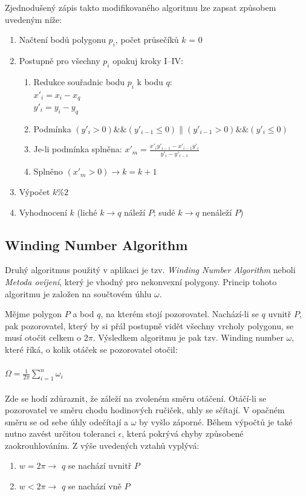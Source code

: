 \documentclass[a4paper, 12pt]{article}
\begin{document}
Zjednodušený zápis takto modifikovaného algoritmu lze zapsat způsobem uvedeným níže:
\begin{enumerate}
\item Načtení bodů polygonu $p_i$, počet průsečíků $k$ = 0
\item Postupně pro všechny $p_i$ opakuj kroky I–IV:
\begin{enumerate}[label=\Roman*.]
\item 	Redukce souřadnic bodu $p_i$ k bodu $q$:\\
$x'_i = x_i - x_q$\\
$y'_i = y_i - y_q$
\item 	Podmínka $(y'_i > 0)\&\&(y'_{i-1} \leq 0)\|(y'_{i-1} > 0)\&\&(y'_{i} \leq 0)$
\item 	Je-li podmínka splněna: $x'_m = \frac{x'_i y'_{i-1} - x'_{i-1} y'_i}{y'_i - y'_{i-1}}$
\item Splněno $(x'_m > 0) \rightarrow k = k + 1$ 
\end{enumerate}
\item Výpočet $k\%2$
\item Vyhodnocení $k$ (liché $k \rightarrow q$ náleží $P$; sudé $k \rightarrow q$ nenáleží $P$)
\end{enumerate}

\subsection{Winding Number Algorithm}
Druhý algoritmus použitý v aplikaci je tzv. \textit{Winding Number Algorithm} neboli \textit{Metoda ovíjení}, který je vhodný pro nekonvexní polygony. Princip tohoto algoritmu je založen na součtovém úhlu $\omega$.

Mějme polygon $P$ a bod $q$, na kterém stojí pozorovatel. Nachází-li se $q$ uvnitř $P$, pak pozorovatel, který by si přál postupně vidět všechny vrcholy polygonu, se musí otočit celkem o $2\pi$. Výsledkem algoritmu je pak tzv. Winding number $\omega$, které říká, o kolik otáček se pozorovatel otočil: \\ \\
$\Omega = \frac{1}{2\pi} \sum_{i=1}^n \omega_i$\\ \\
Zde se hodí zdůraznit, že záleží na zvoleném směru otáčení. Otáčí-li se pozorovatel ve směru chodu hodinových ručiček, uhly se sčítají. V opačném směru se od sebe úhly odečítají a $\omega$ by vyšlo záporné. Během výpočtů je také nutno zavést určitou toleranci $\epsilon$, která pokrývá chyby způsobené zaokrouhlováním.
Z výše uvedených vztahů vyplývá:
\begin{enumerate} 
\item $w = 2\pi \rightarrow$ $q$ se nachází uvnitř $P$
\item  $w < 2\pi \rightarrow$ $q$ se nachází vně $P$
\end{enumerate}
\end{document}
